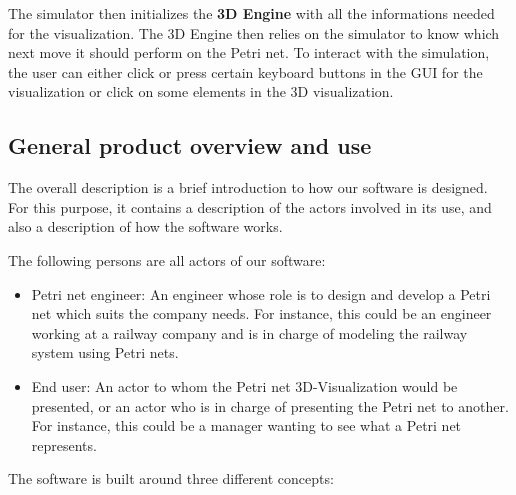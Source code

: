 The simulator then initializes the \textbf{3D Engine} with all the informations needed for the visualization. The 3D Engine then relies on the simulator to know which next move it should perform on the Petri net. \newline
To interact with the simulation, the user can either click or press certain keyboard buttons in the GUI for the visualization or click on some elements in the 3D visualization.

\subsection{General product overview and use}
The overall description is a brief introduction to how our software is designed. For this purpose, it contains a description of the actors involved in its use, and also a description of how the software works. \newline

The following persons are all actors of our software:

\begin{itemize}
  \item Petri net engineer: An engineer whose role is to design and develop a Petri net which suits the company needs. \newline
  For instance, this could be an engineer working at a railway company and is in charge of modeling the railway system using Petri nets.
  \item End user: An actor to whom the Petri net 3D-Visualization would be presented, or an actor who is in charge of presenting the Petri net to another. \newline
	For instance, this could be a manager wanting to see what a Petri net represents. 
\end{itemize}

The software is built around three different concepts: 

